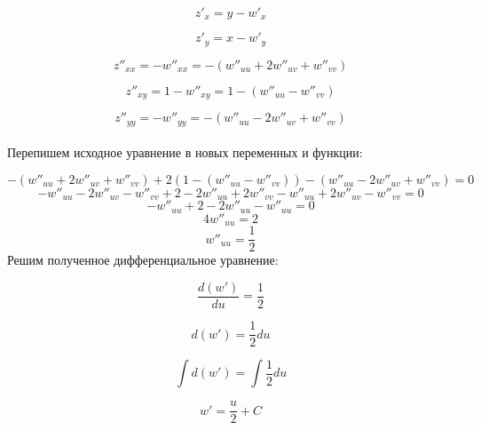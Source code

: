 \documentclass[a5paper, 10pt]{article}
\theoremstyle{definition}
\theoremstyle{plain}
\theoremstyle{remark}
\begin{document}
\begin{equation}
z'_x = y - w'_x
\end{equation}

\begin{equation}
z'_y = x - w'_y
\end{equation}

\begin{equation}
z''_{xx} = - w''_{xx} = - ( w''_{uu} + 2w''_{uv} + w''_{vv})
\end{equation}


\begin{equation}
z''_{xy} = 1 - w''_{xy} = 1 - ( w''_{uu} -  w''_{vv})
\end{equation}

\begin{equation}
z''_{yy} = - w''_{yy} = -( w''_{uu} - 2w''_{uv} + w''_{vv})
\end{equation}
\\
Перепишем исходное уравнение в новых переменных и функции:

\begin{equation}
- ( w''_{uu} + 2w''_{uv} + w''_{vv}) + 2 (1 - ( w''_{uu} -  w''_{vv})) -( w''_{uu} - 2w''_{uv} + w''_{vv}) = 0
\end{equation}
\begin{equation}
- w''_{uu} - 2w''_{uv} - w''_{vv} + 2 -2  w''_{uu} +2  w''_{vv} - w''_{uu} + 2w''_{uv} - w''_{vv} = 0
\end{equation}
\begin{equation}
- w''_{uu}  + 2 -2  w''_{uu}  - w''_{uu}   = 0
\end{equation}
\begin{equation}
4 w''_{uu}  = 2
\end{equation}
\begin{equation}
 w''_{uu}  = \frac{1}{2}
\end{equation}
Решим полученное дифференциальное уравнение:

\begin{equation}
 \frac{d(w')}{du}  = \frac{1}{2}
\end{equation}

\begin{equation}
 d(w')  = \frac{1}{2} du
\end{equation}

\begin{equation}
 \int d(w')  = \int \frac{1}{2} du
\end{equation}

\begin{equation}
 w' =  \frac{u}{2} + C
\end{equation}
\end{document}
